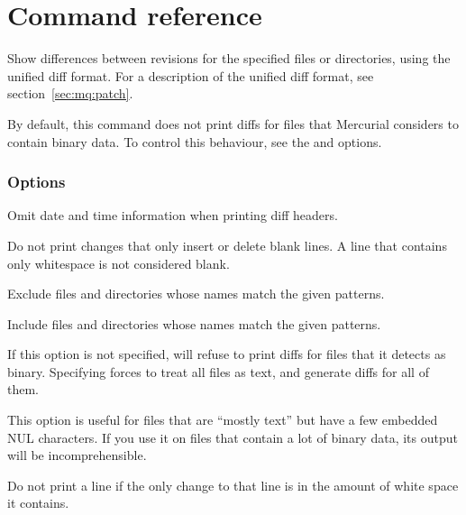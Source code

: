 \chapter{Command reference}
\label{cmdref}



Show differences between revisions for the specified files or
directories, using the unified diff format.  For a description of the
unified diff format, see section~\ref{sec:mq:patch}.

By default, this command does not print diffs for files that Mercurial
considers to contain binary data.  To control this behaviour, see the
 and  options.

\subsection{Options}


Omit date and time information when printing diff headers.


Do not print changes that only insert or delete blank lines.  A line
that contains only whitespace is not considered blank.


Exclude files and directories whose names match the given patterns.


Include files and directories whose names match the given patterns.


If this option is not specified,  will refuse to print
diffs for files that it detects as binary. Specifying 
forces  to treat all files as text, and generate diffs for
all of them.

This option is useful for files that are ``mostly text'' but have a
few embedded NUL characters.  If you use it on files that contain a
lot of binary data, its output will be incomprehensible.


Do not print a line if the only change to that line is in the amount
of white space it contains.

